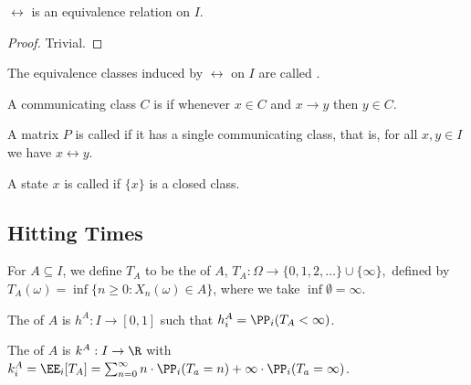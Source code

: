 \documentclass[a4paper]{scrartcl}
\begin{document}
\begin{corollary}
	$\longleftrightarrow$ is an equivalence relation on $I$.
\end{corollary}
\begin{proof}
	Trivial.
\end{proof}

\begin{definition}
	The equivalence classes induced by $\longleftrightarrow$ on $I$ are called .
\end{definition}

A communicating class $C$ is  if whenever $x \in C$ and $x \rightarrow y$ then $y \in C$.

A matrix $P$ is called  if it has a single communicating class, that is, for all $x, y \in I$ we have $x \longleftrightarrow y$. 

A state $x$ is called  if $\{x\}$ is a closed class. 

\subsection{Hitting Times}

\begin{definition}
	For $A \subseteq I$, we define $T_A$ to be the  of $A$,
	$
	T_A: \Omega \rightarrow \{0, 1, 2, \dots \} \cup \{\infty\},
	$
	defined by $T_A(\omega) = \inf\{ n \geq 0: X_n(\omega) \in A\}$, where we take $\inf \emptyset = \infty$.

	The  of $A$ is $h^A: I \rightarrow [0, 1]$ such that $h_i^A = \PP_i(T_A < \infty)$.

	The  of $A$ is $k^A: I \rightarrow \R$ with $k_i^A = \EE_i[T_A] = \sum_{n = 0}^{\infty} n \cdot \PP_i(T_a = n) + \infty \cdot \PP_i(T_a = \infty)$.
\end{definition}
\end{document}
